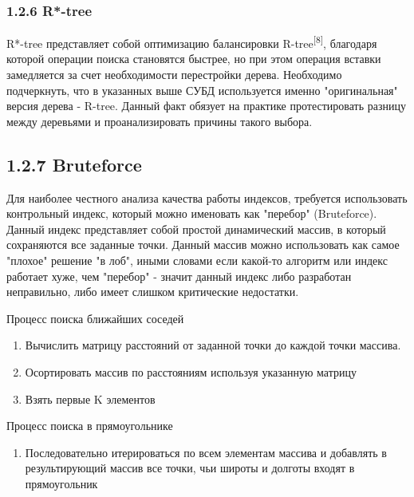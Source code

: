 \subsubsection{1.2.6 R*-tree}
R*-tree представляет собой оптимизацию балансировки R-tree\textsuperscript{[8]}, благодаря которой операции поиска становятся быстрее, но при этом операция вставки замедляется за счет необходимости перестройки дерева. Необходимо подчеркнуть, что в указанных выше СУБД используется именно "оригинальная" версия дерева - R-tree. Данный факт обязует на практике протестировать разницу между деревьями и проанализировать причины такого выбора. 

\subsection{1.2.7 Bruteforce}
Для наиболее честного анализа качества работы индексов, требуется использовать контрольный индекс, который можно именовать как "перебор" (Bruteforce). Данный индекс представляет собой простой динамический массив, в который сохраняются все заданные точки. Данный массив можно использовать как самое "плохое" решение "в лоб", иными словами если какой-то алгоритм или индекс работает хуже, чем "перебор" - значит данный индекс либо разработан неправильно, либо имеет слишком критические недостатки. 

Процесс поиска ближайших соседей
\begin{enumerate}
    \item Вычислить матрицу расстояний от заданной точки до каждой точки массива.
    \item Осортировать массив по расстояниям используя указанную матрицу
    \item Взять первые K элементов
\end{enumerate}

Процесс поиска в прямоугольнике
\begin{enumerate}
    \item Последовательно итерироваться по всем элементам массива и добавлять в результирующий массив все точки, чьи широты и долготы входят в прямоугольник
\end{enumerate}


